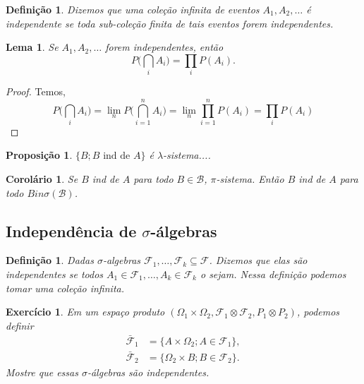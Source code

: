 \documentclass[reqno]{article}
\newcommand*\1{\mathds{1}}
\newtheorem{corollary}[theorem]{Corolário}
\newtheorem{lemma}[theorem]{Lema}
\newtheorem{proposition}[theorem]{Proposição}
\newtheorem{definition}[theorem]{Definição}
\newtheorem{exercise}[example]{Exercício}
\newcommand{\mcap}{\textstyle \bigcap\limits}
\begin{document}
\begin{definition}
  Dizemos que uma coleção infinita de eventos $A_1, A_2, \dots$ é independente se toda sub-coleção finita de tais eventos forem independentes.
\end{definition}

\begin{lemma}
  Se $A_1, A_2, \dots$ forem independentes, então
  \begin{equation}
    P\Big( \mcap_{i} A_i \Big) = \prod\limits_{i} P(A_i).
  \end{equation}
\end{lemma}

\begin{proof}
  Temos,
  \begin{equation}
    P\Big( \mcap_{i} A_i \Big) = \lim_n P\Big( \mcap_{i = 1}^n A_i \Big) = \lim_n \prod\limits_{i=1}^n P(A_i) = \prod\limits_{i} P(A_i)
  \end{equation}
\end{proof}

\begin{proposition}
  $\{B;B \text{ ind de } A\}$ é $\lambda$-sistema....
\end{proposition}

\begin{corollary}
  Se $B$ ind de $A$ para todo $B \in \mathcal{B}$, $\pi$-sistema.
  Então $B$ ind de $A$ para todo $B in \sigma(\mathcal{B})$.
\end{corollary}

\subsection{Independência de $\sigma$-álgebras}

\begin{definition}
  Dadas $\sigma$-algebras $\mathcal{F}_1, \dots, \mathcal{F}_k \subseteq \mathcal{F}$.
  Dizemos que elas são independentes se todos $A_1 \in \mathcal{F}_1, \dots, A_k \in \mathcal{F}_k$ o sejam.
  Nessa definição podemos tomar uma coleção infinita.
\end{definition}

\begin{exercise}
  Em um espaço produto $(\Omega_1 \times \Omega_2, \mathcal{F}_1 \otimes \mathcal{F}_2, P_1 \otimes P_2)$, podemos definir
  \begin{equation}
    \begin{split}
      \bar{\mathcal{F}}_1 & = \{A \times \Omega_2; A \in \mathcal{F}_1\},\\
      \bar{\mathcal{F}}_2 & = \{\Omega_2 \times B; B \in \mathcal{F}_2\}.
    \end{split}
  \end{equation}
  Mostre que essas $\sigma$-álgebras são independentes.
\end{exercise}
\end{document}
